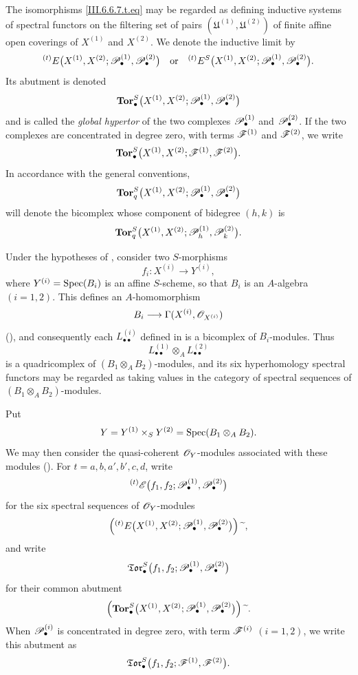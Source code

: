 \begin{env}[6.6.7]

The isomorphisms \eqref{III.6.6.7.t.eq} may be regarded as
defining inductive systems of spectral functors on the filtering
set of pairs
$(\mathfrak U^{(1)},\mathfrak U^{(2)})$ of finite affine open
coverings of $X^{(1)}$ and $X^{(2)}$.  We denote the inductive
limit by
\[
  {}^{(t)}E
  \bigl(
    X^{(1)},X^{(2)};
    \mathscr{P}_\bullet^{(1)},\mathscr{P}_\bullet^{(2)}
  \bigr)
  \quad\text{or}\quad
  {}^{(t)}E^S
  \bigl(
    X^{(1)},X^{(2)};
    \mathscr{P}_\bullet^{(1)},\mathscr{P}_\bullet^{(2)}
  \bigr).
\]
Its abutment is denoted
\[
  \mathbf{Tor}_\bullet^S
  \bigl(
    X^{(1)},X^{(2)};
    \mathscr{P}_\bullet^{(1)},\mathscr{P}_\bullet^{(2)}
  \bigr)
\]
and is called the \emph{global hypertor} of the two complexes
$\mathscr{P}_\bullet^{(1)}$ and $\mathscr{P}_\bullet^{(2)}$.  If the two
complexes are concentrated in degree zero, with terms
$\mathscr{F}^{(1)}$ and $\mathscr{F}^{(2)}$, we write
\[
  \mathbf{Tor}_\bullet^S
  \bigl(
    X^{(1)},X^{(2)};
    \mathscr{F}^{(1)},\mathscr{F}^{(2)}
  \bigr).
\]
In accordance with the general conventions,
\[
  \mathbf{Tor}_q^S
  \bigl(
    X^{(1)},X^{(2)};
    \mathscr{P}_\bullet^{(1)},\mathscr{P}_\bullet^{(2)}
  \bigr)
\]
will denote the bicomplex whose component of bidegree $(h,k)$ is
\[
  \mathbf{Tor}_q^S
  \bigl(
    X^{(1)},X^{(2)};
    \mathscr{P}_h^{(1)},\mathscr{P}_k^{(2)}
  \bigr).
\]
\end{env}

\begin{env}[6.6.8]
\label{III.6.6.8}
Under the hypotheses of , consider two
$S$-morphisms
\[
  f_i:X^{(i)}\longrightarrow Y^{(i)},
\]
where
$Y^{(i)}=\operatorname{Spec}(B_i)$ is an affine $S$-scheme, so that $B_i$ is
an $A$-algebra $(i=1,2)$.  This defines an $A$-homomorphism
\[
  B_i\longrightarrow
  \Gamma(X^{(i)},\mathscr{O}_{X^{(i)}})
\]
(), and consequently each
$L_{\bullet\bullet}^{(i)}$ defined in  is a
bicomplex of $B_i$-modules.  Thus
\[
  L_{\bullet\bullet}^{(1)}
  \otimes_A L_{\bullet\bullet}^{(2)}
\]
is a quadricomplex of $(B_1\otimes_AB_2)$-modules, and its six
hyperhomology spectral functors may be regarded as taking values
in the category of spectral sequences of
$(B_1\otimes_AB_2)$-modules.

Put
\[
  Y=Y^{(1)}\times_SY^{(2)}
   =\operatorname{Spec}(B_1\otimes_AB_2).
\]
We may then consider the quasi-coherent $\mathscr{O}_Y$-modules
associated with these modules ().  For
$t=a,b,a',b',c,d$, write
\[
  {}^{(t)}\mathscr{E}
  \bigl(
    f_1,f_2;
    \mathscr{P}_\bullet^{(1)},\mathscr{P}_\bullet^{(2)}
  \bigr)
\]
for the six spectral sequences of $\mathscr{O}_Y$-modules
\[
  \left(
    {}^{(t)}E
    \bigl(
      X^{(1)},X^{(2)};
      \mathscr{P}_\bullet^{(1)},\mathscr{P}_\bullet^{(2)}
    \bigr)
  \right){\,\widetilde{\,}\,},
\]
and write
\[
  \mathfrak{Tor}_\bullet^S
  \bigl(
    f_1,f_2;
    \mathscr{P}_\bullet^{(1)},\mathscr{P}_\bullet^{(2)}
  \bigr)
\]
for their common abutment
\[
  \left(
    \mathbf{Tor}_\bullet^S
    \bigl(
      X^{(1)},X^{(2)};
      \mathscr{P}_\bullet^{(1)},\mathscr{P}_\bullet^{(2)}
    \bigr)
  \right){\,\widetilde{\,}\,}.
\]
When $\mathscr{P}_\bullet^{(i)}$ is concentrated in degree zero, with
term $\mathscr{F}^{(i)}$ $(i=1,2)$, we write this abutment as
\[
  \mathfrak{Tor}_\bullet^S
  \bigl(
    f_1,f_2;
    \mathscr{F}^{(1)},\mathscr{F}^{(2)}
  \bigr).
\]
\end{env}


